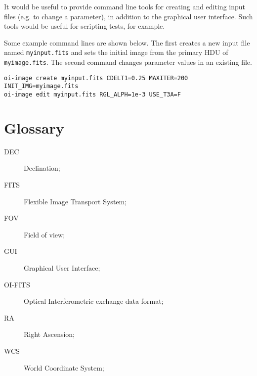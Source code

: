 \documentclass{article}
\begin{document}
It would be useful to provide command line tools for creating and
editing input files (e.g. to change a parameter), in addition to the
graphical user interface. Such tools would be useful for scripting
tests, for example.

Some example command lines are shown below. The first creates a new input
file named \verb+myinput.fits+ and sets the initial image from the
primary HDU of \verb+myimage.fits+. The second command changes
parameter values in an existing file.

\begin{verbatim}
oi-image create myinput.fits CDELT1=0.25 MAXITER=200 INIT_IMG=myimage.fits
oi-image edit myinput.fits RGL_ALPH=1e-3 USE_T3A=F
\end{verbatim}

\appendix
\section{Glossary}

\begin{description}
\item[DEC] Declination;
\item[FITS] Flexible Image Transport System;
\item[FOV] Field of view;
\item[GUI] Graphical User Interface;
\item[OI-FITS] Optical Interferometric exchange data format;
\item[RA] Right Ascension;
\item[WCS] World Coordinate System;
\end{description}



\end{document}
